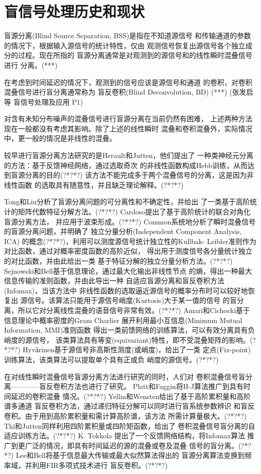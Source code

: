 \section{盲信号处理历史和现状}
盲源分离(Blind Source Separation, BSS)是指在不知道源信号
和传输通道的参数的情况下，根据输入源信号的统计特性，仅由
观测信号恢复出源信号各个独立成分的过程。现在所指的
盲源分离通常是对观测到的源信号和的线性瞬时混叠信号进行
分离。(***)

在考虑到时间延迟的情况下，观测到的信号应该是源信号和通道
的卷积，对卷积混叠信号进行盲分离通常称为
盲反卷积(Blind Deconvolution, BD) (***)
(张发启 等 盲信号处理及应用 P1)

对含有未知分布噪声的混叠信号进行盲源分离在当前仍然有困难，
上述两种方法现在一般都没有考虑其影响。除了上述的线性瞬时
混叠和卷积混叠外，实际情况中，更一般的情况是非线性的混叠。

较早进行盲源分离方法研究的是Herault和Jutten，他们提出了
一种类神经元分离的方法：基于反馈神经网络，通过选取奇次
的非线性函数构成Hebb训练，从而达到盲源分离的目的(?*?*?)
该方法不能完成多于两个混叠信号的分离，这是因为非线性函数
的选取具有随意性，并且缺乏理论解释。(?*?*?)

Tong和Liu分析了盲源分离问题的可分离性和不确定性，并给出
了一类基于高阶统计的矩阵代数特征分解方法。(?*?*?)
Cardoso提出了基于高阶统计的联合对角化盲源分离方法，
并应用于波束形成。(?*?*?)
Common系统地分析了瞬时混叠信号的盲源分离问题，并明确了
独立分量分析(Independent Component Analysis, ICA)
的概念(?*?*?)，利用可以测度源信号统计独立性的Kullbak-
Leibler准则作为对比函数，通过对概率密度函数的高阶近似，
得出用于测度信号各分量统计独立的对比函数，并由此给出一类
基于特征分解的独立分量分析方法。(?*?*?)
Sejnowski和Bell基于信息理论，通过最大化输出非线性节点
的熵，得出一种最大信息传输的准则函数，并由此导出一种
自适应盲源分离和盲反卷积方法(Infomax)，当该方法中
非线性函数的选取逼近源信号的概率分布时可以较好地恢复出
源信号。该算法只能用于源信号峭度(Kurtosis)大于某一值的信号
的盲分离，所以它对分离线性混叠的语音信号非常有效。(?*?*?)
Amari和Cichocki基于信息理论中概率密度的Gram Charlier
展开利用最小互信息(Minimum Mutual Information, MMI)准则函数
得出一类前馈网络的训练算法，可以有效分离具有负峭度的源信号，
该类算法具有等变(equivariant)特性，即不受混叠矩阵的影响。(?*?*?)
Hyvӓrinen基于源信号非高斯性测度(或峭度)，给出了一类
定点(Fix-point)训练算法，该类算法可以提取单个具有正或负
峭度的源信号。(?*?*?)

在对线性瞬时混叠信号盲源分离方法进行研究的同时，人们对
卷积混叠信号盲分离————盲反卷积方法也进行了研究。
Platt和Faggin将H-J算法推广到具有时间延迟的卷积混叠
情况。(?*?*?)
Yellin和Wensten给出了基于高阶累积量和高阶谱多通道
盲反卷积方法，通过递归特征分解可以同时进行盲系统参数辨识
和盲反卷积。由于用到高阶累积量和需计算高阶谱，该方法
所需计算量极大。(?*?*?)
Thi和Jutten同样利用四阶累积量或四阶矩函数，给出了
卷积混叠信号盲分离的自适应训练方法。(?*?*?)
K. Tokkola 提出了一个反馈网络结构，将Infomax算法
推广到更广泛的情况，即具有时间延迟的源的混叠或卷及混叠
信号的盲分离。(?*?*?)
Lee和Bell将基于信息最大传输或最大似然算法得出的
盲源分离算法变换到频率域，并利用FIR多项式技术进行
盲反卷积。(?*?*?)

